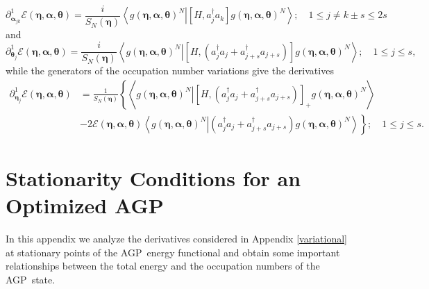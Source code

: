 \documentclass[aps,preprint]{revtex4}%
\begin{document}
\begin{equation}
\partial_{\bm{\alpha}_{jk}}^{1}\mathcal{E}\left(
\bm{\eta },\bm{\alpha},\bm{\theta}\right)  =\frac{i}{S_{N}\left(
\bm{\eta}\right)  }\left\langle \left.  g\left(
\bm{\eta },\bm{\alpha},\bm{\theta}\right)  ^{N}\right\vert \left[
H,a_{j}^{\dagger}a_{k}\right]  g\left(
\bm{\eta},\bm{\alpha },\bm{\theta}\right)  ^{N}\right\rangle ;\quad1\leq
j\neq k\pm s\leq2s \label{Dlamda}%
\end{equation}
and
\begin{equation}
\partial_{\bm{\theta}_{j}}^{1}\mathcal{E}\left(
\bm{\eta },\bm{\alpha},\bm{\theta}\right)  =\frac{i}{S_{N}\left(
\bm{\eta}\right)  }\left\langle \left.  g\left(
\bm{\eta },\bm{\alpha},\bm{\theta}\right)  ^{N}\right\vert \left[  H,\left(
a_{j}^{\dagger}a_{j}+a_{j+s}^{\dagger}a_{j+s}\right)  \right]  g\left(
\bm{\eta},\bm{\alpha},\bm{\theta}\right)  ^{N}\right\rangle ;\quad1\leq j\leq
s, \label{Dtheta}%
\end{equation}
while the generators of the occupation number variations give the derivatives
\begin{align}
\partial_{\bm{\eta}_{j}}^{1}\mathcal{E}\left(
\bm{\eta},\bm{\alpha},\bm{\theta}\right)   &  =\frac{1}{S_{N}\left(
\bm{\eta}\right)  }\left\{  \left\langle \left.  g\left(
\bm{\eta },\bm{\alpha},\bm{\theta}\right)  ^{N}\right\vert \left[  H,\left(
a_{j}^{\dagger}a_{j}+a_{j+s}^{\dagger}a_{j+s}\right)  \right]  _{+}g\left(
\bm{\eta},\bm{\alpha},\bm{\theta}\right)  ^{N}\right\rangle \right.
\nonumber\\
&  -\left.  2\mathcal{E}\left(  \bm{\eta},\bm{\alpha},\bm{\theta }\right)
\left\langle \left.  g\left(  \bm{\eta},\bm{\alpha },\bm{\theta}\right)
^{N}\right\vert \left(  a_{j}^{\dagger}a_{j}+a_{j+s}^{\dagger}a_{j+s}\right)
g\left(  \bm{\eta},\bm{\alpha },\bm{\theta}\right)  ^{N}\right\rangle
\right\}  ;\quad1\leq j\leq s. \label{Deta}%
\end{align}


\section{Stationarity Conditions for an Optimized AGP\label{StatAGPCond}}

In this appendix we analyze the derivatives considered in Appendix
\ref{variational} at stationary points of the AGP\ energy functional and
obtain some important relationships between the total energy and the
occupation numbers of the AGP\ state.
\end{document}
